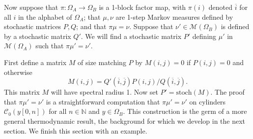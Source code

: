 \documentclass{kepart2010}
\theoremstyle{plain}
\theoremstyle{definition}
\theoremstyle{remark}
\theoremstyle{definition}
\numberwithin{equation}{section}
\begin{document}
Now suppose that $\pi:\Omega_A\to \Omega_B$ is a 1-block factor map,
with $\pi (i)$ denoted $\overline i$ for all $i$ in the alphabet of
$\Omega_A$; that $\mu ,\nu$ are 1-step Markov measures defined by
stochastic matrices $P,Q$; and that $\pi\mu = \nu$.
Suppose that $\nu'\in \mathcal M(\Omega_B)$ is defined by a
stochastic matrix $Q'$. We will find a stochastic matrix $P'$
defining $\mu '$ in $\mathcal M(\Omega_A)$
such that $\pi \mu'=\nu'$.

First define a matrix $M$ of size matching $P$ by
$M(i,j)=0$ if $P(i,j)=0$ and
otherwise
 \begin{equation}  \label{markovmarkovian}
M(i,j)=
Q'(\overline i, \overline j) P(i,j)/ Q(\overline i, \overline j) .
 \end{equation}
This matrix $M$ will have spectral radius 1.
Now set $P'=\text{stoch}(M)$.
The proof that $\pi \mu' = \nu'$ is a straightforward computation
that  $\pi \mu' = \nu'$ on  cylinders
$\mathcal C_0(y[0,n])$
 for all $n\in \mathbb N$ and $y\in \Omega_B$.
This construction is the
germ of a more general thermodynamic result, the background for
which we develop in the next section. We finish this section
with an example.
\end{document}
